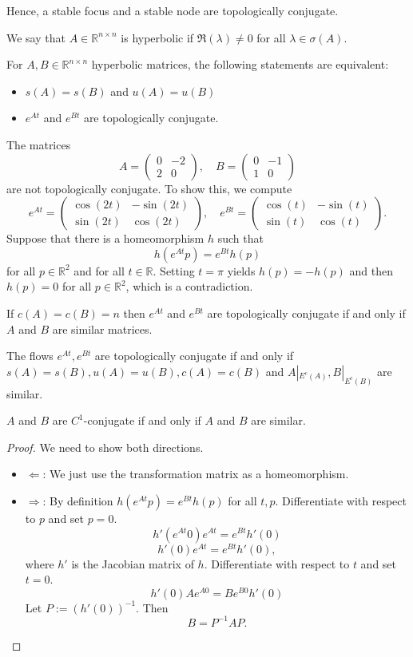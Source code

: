 \documentclass{article}
\newcommand*{\R}{\mathbb{R}}
\newcommand*{\mattwo}[4]{\begin{pmatrix}
    #1&#2\\#3&#4
\end{pmatrix}}
\begin{document}
Hence, a stable focus and a stable node are topologically conjugate.

\begin{defin}
    We say that $A\in \R^{n\times n}$ is hyperbolic if $\Re(\lambda) \neq 0$ for all $\lambda \in \sigma(A)$.
\end{defin}

\begin{thm}
    For $A, B \in \R^{n\times n}$ hyperbolic matrices, the following statements are equivalent:
    \begin{itemize}
        \item $s(A) = s(B)$ and $u(A) = u(B)$

        \item $e^{At}$ and $e^{Bt}$ are topologically conjugate.
    \end{itemize}
\end{thm}

\begin{exam}
    The matrices
    $$A = \mattwo{0}{-2}{2}{0}, \quad B=\mattwo{0}{-1}{1}{0}$$
    are not topologically conjugate. To show this, we compute
    $$e^{At} = \mattwo{\cos(2t)}{-\sin(2t)}{\sin(2t)}{\cos(2t)}, \quad e^{Bt} = \mattwo{\cos(t)}{-\sin(t)}{\sin(t)}{\cos(t)}.$$
    Suppose that there is a homeomorphism $h$ such that
    $$h(e^{At}p) = e^{Bt}h(p)$$
    for all $p\in\R^2$ and for all $t\in \R$. Setting $t = \pi$ yields $h(p)= -h(p)$ and then $h(p) = 0$ for all $p \in \R^2$, which is a contradiction.
\end{exam}

\begin{thm}
    If $c(A) = c(B) =n$ then $e^{At}$ and $e^{Bt}$ are topologically conjugate if and only if $A$ and $B$ are similar matrices.
\end{thm}

\begin{thm}
    The flows $e^{At}, e^{Bt}$ are topologically conjugate if and only if $s(A) = s(B), u(A) = u(B), c(A) = c(B)$ and $A|_{E^c(A)}, B|_{E^c(B)}$ are similar.
\end{thm}

\begin{prop}
    $A$ and $B$ are $C^1$-conjugate if and only if $A$ and $B$ are similar.
\end{prop}

\begin{proof}
    We need to show both directions.
    \begin{itemize}
        \item $\Leftarrow$: We just use the transformation matrix as a homeomorphism.

        \item $\Rightarrow$: By definition $h(e^{At}p)=e^{Bt}h(p)$ for all $t,p$. Differentiate with respect to $p$ and set $p = 0$.
        $$h'(e^{At}0)e^{At}=e^{Bt}h'(0)$$
        $$h'(0)e^{At}=e^{Bt}h'(0),$$
        where $h'$ is the Jacobian matrix of $h$. Differentiate with respect to $t$ and set $t=0$.
        $$h'(0)Ae^{A0}=Be^{B0}h'(0)$$
        Let $P := (h'(0))^{-1}$. Then
        $$B=P^{-1}AP.$$
    \end{itemize}
\end{proof}
\end{document}
